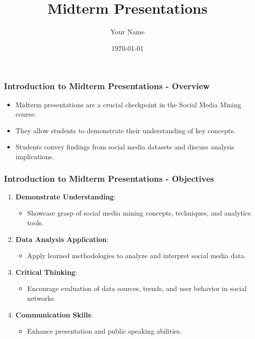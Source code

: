 \documentclass{beamer}
\title{Midterm Presentations}
\author{Your Name}
\institute{Your Institution}
\date{\today}
\begin{document}
\frame{\titlepage}

\begin{frame}[fragile]
    \titlepage
\end{frame}

\begin{frame}[fragile]
    \frametitle{Introduction to Midterm Presentations - Overview}
    \begin{itemize}
        \item Midterm presentations are a crucial checkpoint in the Social Media Mining course.
        \item They allow students to demonstrate their understanding of key concepts.
        \item Students convey findings from social media datasets and discuss analysis implications.
    \end{itemize}
\end{frame}

\begin{frame}[fragile]
    \frametitle{Introduction to Midterm Presentations - Objectives}
    \begin{enumerate}
        \item \textbf{Demonstrate Understanding}:
            \begin{itemize}
                \item Showcase grasp of social media mining concepts, techniques, and analytics tools.
            \end{itemize}
        \item \textbf{Data Analysis Application}:
            \begin{itemize}
                \item Apply learned methodologies to analyze and interpret social media data.
            \end{itemize}
        \item \textbf{Critical Thinking}:
            \begin{itemize}
                \item Encourage evaluation of data sources, trends, and user behavior in social networks.
            \end{itemize}
        \item \textbf{Communication Skills}:
            \begin{itemize}
                \item Enhance presentation and public speaking abilities.
            \end{itemize}
    \end{enumerate}
\end{frame}
\end{document}
